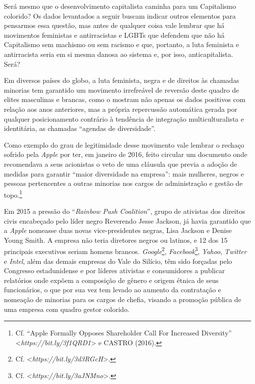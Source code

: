 Será mesmo que o desenvolvimento capitalista caminha para um Capitalismo
colorido? Os dados levantados a seguir buscam indicar outros elementos
para pensarmos essa questão, mas antes de qualquer coisa vale lembrar
que há movimentos feministas e antirracistas e LGBTs que defendem que
não há Capitalismo sem machismo ou sem racismo e que, portanto, a luta
feminista e antirracista seria em si mesma danosa ao sistema e, por
isso, anticapitalista. Será?

Em diversos países do globo, a luta feminista, negra e de direitos às
chamadas minorias tem garantido um movimento irrefreável de reversão
deste quadro de elites masculinas e brancas, como o mostram não apenas
os dados positivos com relação aos anos anteriores, mas a própria
repercussão automática gerada por qualquer posicionamento contrário à
tendência de integração multiculturalista e identitária, as chamadas
``agendas de diversidade''.

Como exemplo do grau de legitimidade desse movimento vale lembrar o
rechaço sofrido pela \emph{Apple} por ter, em janeiro de 2016, feito
circular um documento onde recomendava a seus acionistas o veto de uma
cláusula que previa a adoção de medidas para garantir ``maior
diversidade na empresa'': mais mulheres, negros e pessoas pertencentes a
outras minorias nos cargos de administração e gestão de topo.\footnote{Cf.
  ``Apple Formally Opposes Shareholder Call For Increased Diversity''
  \textless{}\emph{https://bit.ly/3f1QRD1}\textgreater{}
  e CASTRO (2016).}

Em 2015 a pressão do ``\emph{Rainbow Push Coalition}'', grupo de
ativistas dos direitos civis encabeçado pelo líder negro Reverendo Jesse
Jackson, já havia garantido que a \emph{Apple} nomeasse duas novas
vice-presidentes negras, Lisa Jackson e Denise Young Smith. A empresa
não teria diretores negros ou latinos, e 12 dos 15 principais executivos
seriam homens brancos. \emph{Google}\footnote{Cf.
  \textless{}\emph{https://bit.ly/3d3RGcH}\textgreater{}.},
\emph{Facebook}\footnote{Cf.
  \textless{}\emph{https://bit.ly/3aJNMno}\textgreater{}.},
\emph{Yahoo}, \emph{Twitter} e \emph{Intel}, além das demais empresas do
Vale do Silício, têm sido forçadas pelo Congresso estadunidense e por
líderes ativistas e consumidores a publicar relatórios onde expõem a
composição de gênero e origem étnica de seus funcionários, o que por sua
vez tem levado ao aumento da contratação e nomeação de minorias para os
cargos de chefia, visando a promoção pública de uma empresa com quadro
gestor colorido.

